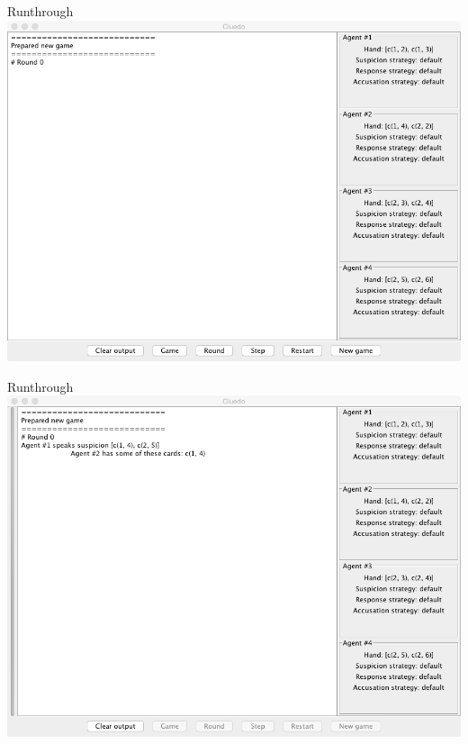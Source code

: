 \begin{frame}{Runthrough}
    \centering
    \includegraphics[height=0.8\textheight]{images/Prep}
\end{frame}

\begin{frame}{Runthrough}
    \centering
    \includegraphics[height=0.8\textheight]{images/Running}
\end{frame}

